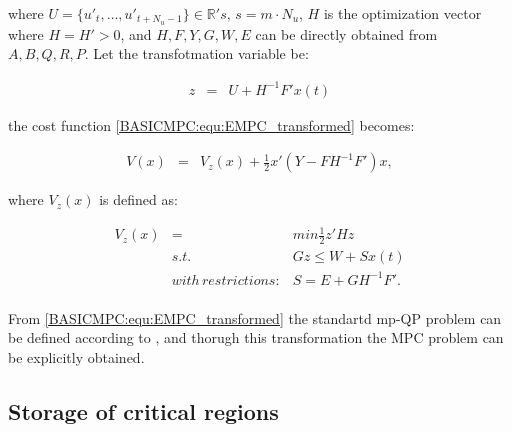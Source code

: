 		where $U=\{u'_t,\dots,u'_{t+N_u-1}\}\in\mathbb{R}'s,\,s=m\cdot N_u$, $H$ is the optimization vector where $H=H'>0$, and $H,F,Y,G,W,E$ can be directly obtained from $A,B,Q,R,P$. Let the transfotmation variable be:
		
		\begin{equation}
        \begin{array}{rcl}
				z&=&U+H^{-1}F'x(t)
        \end{array}
        \label{BASICMPC:equ:EMPC_trans_var}
    \end{equation}
		
		the cost function \ref{BASICMPC:equ:EMPC_transformed} becomes:
		
		\begin{equation}
        \begin{array}{rcl}
				V(x)&=&V_z(x)+\frac{1}{2}x'\left(Y-FH^{-1}F'\right)x,
        \end{array}
        \label{BASICMPC:equ:EMPC_trans_var}
    \end{equation}
		
		where $V_z(x)$ is defined as:
		
		\begin{equation}
        \begin{array}{rcl}
				V_z(x)&=&min\frac{1}{2}z'Hz\\
				&s.t.&Gz\leq W+Sx(t)\\
				&with\,restrictions:&S=E+GH^{-1}F'.\\
        \end{array}
        \label{BASICMPC:equ:EMPC_transformed}
    \end{equation}
		
		From \ref{BASICMPC:equ:EMPC_transformed} the standartd mp-QP problem can be defined according to \cite{borrelli2017predictive}, and thorugh this transformation the MPC problem can be explicitly obtained. 
		

\subsection{Storage of critical regions}

